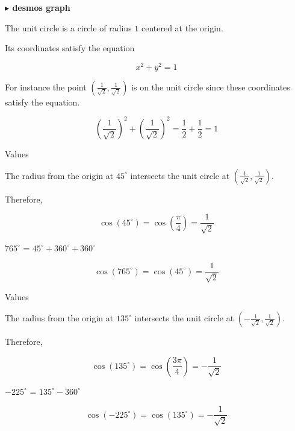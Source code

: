 \documentclass{ximera}
\begin{document}
\begin{onlineOnly}
\textbf{\textcolor{blue!55!black}{$\blacktriangleright$ desmos graph}} 
\begin{center}
\end{center}
\end{onlineOnly}



The unit circle is a circle of radius $1$ centered at the origin.


Its coordinates satisfy the equation

\[
x^2 + y^ 2 = 1
\]


For instance the point $\left( \frac{1}{\sqrt{2}}, \frac{1}{\sqrt{2}} \right)$ is on the unit circle since these coordinates satisfy the equation.


\[
\left( \frac{1}{\sqrt{2}} \right)^2 + \left( \frac{1}{\sqrt{2}} \right)^2 = \frac{1}{2} + \frac{1}{2} = 1
\]




\begin{example} Values

The radius from the origin at $45^{\circ}$ intersects the unit circle at $\left( \frac{1}{\sqrt{2}},  \frac{1}{\sqrt{2}} \right)$.


Therefore,

\[
\cos(45^{\circ}) = \cos\left( \frac{\pi}{4} \right) = \frac{1}{\sqrt{2}}
\]



$765^{\circ}$ = $45^{\circ} + 360^{\circ} + 360^{\circ}$


\[
\cos(765^{\circ}) = \cos(45^{\circ}) = \frac{1}{\sqrt{2}}
\]


\end{example}








\begin{example} Values

The radius from the origin at $135^{\circ}$ intersects the unit circle at $\left( -\frac{1}{\sqrt{2}},  \frac{1}{\sqrt{2}} \right)$.


Therefore,

\[
\cos(135^{\circ}) = \cos\left( \frac{3\pi}{4} \right) = -\frac{1}{\sqrt{2}}
\]



$-225^{\circ}$ = $135^{\circ} - 360^{\circ}$


\[
\cos(-225^{\circ}) = \cos(135^{\circ}) = -\frac{1}{\sqrt{2}}
\]


\end{example}
\end{document}
